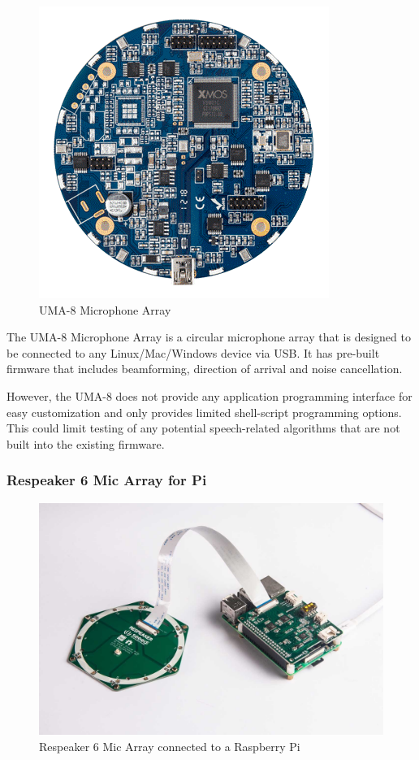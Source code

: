 \documentclass[hidelinks,12pt]{report} %
\begin{document}
\begin{figure}[h]
\centering
\includegraphics[scale = 1.0]{fig2.6} 
\caption{UMA-8 Microphone Array}
\label{fig}
\end{figure}

The UMA-8 Microphone Array is a circular microphone array that is designed to be connected to any Linux/Mac/Windows device via USB. It has pre-built firmware that includes beamforming, direction of arrival and noise cancellation.

However, the UMA-8 does not provide any application programming interface for easy customization and only provides limited shell-script programming options. This could limit testing of any potential speech-related algorithms that are not built into the existing firmware\cite{22}. 

\subsubsection{Respeaker 6 Mic Array for Pi}

\begin{figure}[h]
\centering
\includegraphics[scale = 1.0]{fig2.7} 
\caption{Respeaker 6 Mic Array connected to a Raspberry Pi}
\label{fig}
\end{figure}
\end{document}
